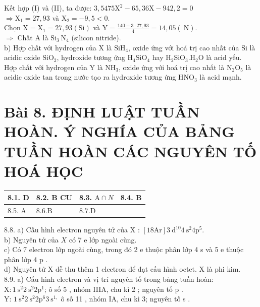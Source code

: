 \documentclass[10pt]{article}
\begin{document}
Kết hợp (I) và (II), ta được: $3,5475 \mathrm{X}^{2}-65,36 \mathrm{X}-942,2=0$\\
$\Rightarrow \mathrm{X}_{1}=27,93$ và $\mathrm{X}_{2}=-9,5<0$.\\
Chọn $\mathrm{X}=\mathrm{X}_{1}=27,93(\mathrm{Si})$ và $\mathrm{Y}=\frac{140-3 \cdot 27,93}{4}=14,05(\mathrm{~N})$.\\
$\Rightarrow$ Chất A là $\mathrm{Si}_{3} \mathrm{~N}_{4}$ (silicon nitride).\\
b) Hợp chất với hydrogen của X là $\mathrm{SiH}_{4}$, oxide ứng với hoá trị cao nhất của Si là acidic oxide $\mathrm{SiO}_{2}$, hydroxide tương ứng $\mathrm{H}_{4} \mathrm{SiO}_{4}$ hay $\mathrm{H}_{2} \mathrm{SiO}_{3} . \mathrm{H}_{2} \mathrm{O}$ là acid yếu.\\
Hợp chất với hydrogen của Y là $\mathrm{NH}_{3}$, oxide ứng với hoá trị cao nhất là $\mathrm{N}_{2} \mathrm{O}_{5}$ là acidic oxide tan trong nước tạo ra hydroxide tương ứng $\mathrm{HNO}_{3}$ là acid mạnh.

\section*{Bài 8. ĐỊNH LUẬT TUẦN HOÀN. Ý NGHÍA CỦA BẢNG TUẦN HOÀN CÁC NGUYÊN TỐ HOÁ HỌC}
\begin{center}
\begin{tabular}{|l|l|l|l|}
\hline
8.1. D & 8.2. B CU & 8.3. $\mathrm{A} \cap N$ & 8.4. B \\
\hline
8.5. A & $8.6 . \mathrm{B}$ & $8.7 . \mathrm{D}$ &  \\
\hline
\end{tabular}
\end{center}

8.8. a) Cấu hình electron nguyên tử của X : $[18 \mathrm{Ar}] 3 \mathrm{~d}^{10} 4 \mathrm{~s}^{2} 4 \mathrm{p}^{5}$.\\
b) Nguyên tử của $X$ có 7 e lớp ngoài cùng.\\
c) Có 7 electron lớp ngoài cùng, trong đó 2 e thuộc phân lớp 4 s và 5 e thuộc phân lớp 4 p .\\
d) Nguyên tử X dễ thu thêm 1 electron để đạt cấu hình octet. X là phi kim.\\
8.9. a) Cấu hình electron và vị trí nguyên tố trong bảng tuần hoàn:\\
$\mathrm{X}: 1 \mathrm{~s}^{2} 2 \mathrm{~s}^{2} 2 \mathrm{p}^{1}$; ô số 5 , nhóm IIIA, chu kì 2 ; nguyên tố p .\\
Y: $1 \mathrm{~s}^{2} 2 \mathrm{~s}^{2} 2 \mathrm{p}^{6} 3 \mathrm{~s}^{1,}$ ô số 11 , nhóm IA, chu kì 3; nguyên tố s .
\end{document}
